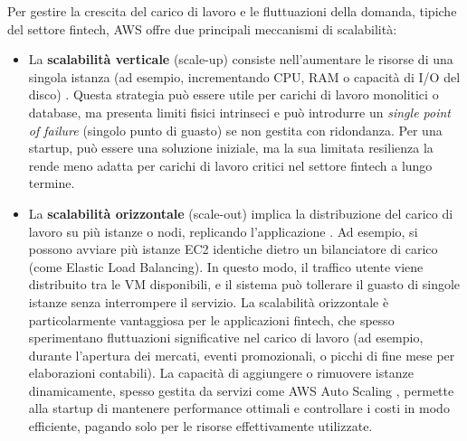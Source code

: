 Per gestire la crescita del carico di lavoro e le fluttuazioni della domanda, tipiche del settore fintech, AWS offre due principali meccanismi di scalabilità:
\begin{itemize}
    \item La \textbf{scalabilità verticale} (scale-up) consiste nell'aumentare le risorse di una singola istanza (ad esempio, incrementando CPU, RAM o capacità di I/O del disco) \cite{awsAutoScaling}. Questa strategia può essere utile per carichi di lavoro monolitici o database, ma presenta limiti fisici intrinseci e può introdurre un \textit{single point of failure} (singolo punto di guasto) se non gestita con ridondanza. Per una startup, può essere una soluzione iniziale, ma la sua limitata resilienza la rende meno adatta per carichi di lavoro critici nel settore fintech a lungo termine.
    \item La \textbf{scalabilità orizzontale} (scale-out) implica la distribuzione del carico di lavoro su più istanze o nodi, replicando l'applicazione \cite{awsAutoScaling}. Ad esempio, si possono avviare più istanze EC2 identiche dietro un bilanciatore di carico (come Elastic Load Balancing). In questo modo, il traffico utente viene distribuito tra le VM disponibili, e il sistema può tollerare il guasto di singole istanze senza interrompere il servizio. La scalabilità orizzontale è particolarmente vantaggiosa per le applicazioni fintech, che spesso sperimentano fluttuazioni significative nel carico di lavoro (ad esempio, durante l'apertura dei mercati, eventi promozionali, o picchi di fine mese per elaborazioni contabili). La capacità di aggiungere o rimuovere istanze dinamicamente, spesso gestita da servizi come AWS Auto Scaling \cite{awsAutoScaling}, permette alla startup di mantenere performance ottimali e controllare i costi in modo efficiente, pagando solo per le risorse effettivamente utilizzate.
\end{itemize}

